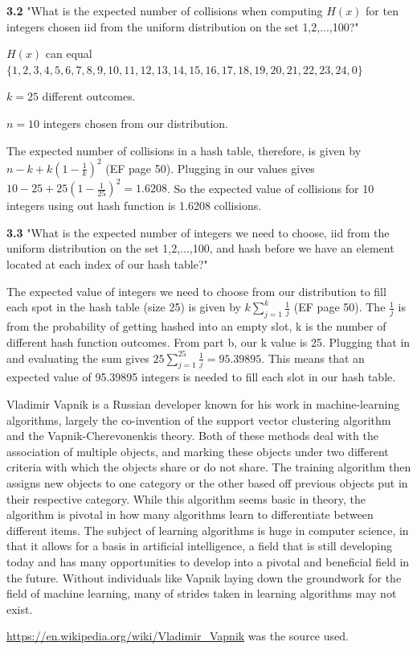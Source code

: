 \documentclass{article}
\begin{document}
\item\textbf{3.2} "What is the expected number of collisions when computing $H(x)$ for ten integers chosen iid from the uniform distribution on the set {1,2,...,100}?"

\item $H(x)$ can equal$ \{1,2,3,4,5,6,7,8,9,10,11,12,13,14,15,16,17,18,19,20,21,22,23,24,0\}$

$k = 25$ different outcomes.

$n = 10$ integers chosen from our distribution.

The expected number of collisions in a hash table, therefore, is given by $n - k + k(1-\frac{1}{k})^2$ (EF page 50). Plugging in our values gives $10 - 25 + 25(1-\frac{1}{25})^2 = 1.6208$. So the expected value of collisions for 10 integers using out hash function is 1.6208 collisions.


\item\textbf{3.3} "What is the expected number of integers we need to choose, iid from the uniform distribution on the set {1,2,...,100}, and hash before we have an element located at each index of our hash table?"
\item The expected value of integers we need to choose from our distribution to fill each spot in the hash table (size 25) is given by $k\sum_{j=1}^{k}\frac{1}{j}$ (EF page 50). The $\frac{1}{j}$ is from the probability of getting hashed into an empty slot, k is the number of different hash function outcomes. From part b, our k value is 25. Plugging that in and evaluating the sum gives $25\sum_{j=1}^{25}\frac{1}{j} = 95.39895$. This means that an expected value of 95.39895 integers is needed to fill each slot in our hash table.


\clearpage
\header
Vladimir Vapnik is a Russian developer known for his work in machine-learning algorithms, largely the co-invention of the support vector clustering algorithm and the Vapnik-Cherevonenkis theory. Both of these methods deal with the association of multiple objects, and marking these objects under two different criteria with which the objects share or do not share. The training algorithm then assigns new objects to one category or the other based off previous objects put in their respective category. While this algorithm seems basic in theory, the algorithm is pivotal in how many algorithms learn to differentiate between different items. The subject of learning algorithms is huge in computer science, in that it allows for a basis in artificial intelligence, a field that is still developing today and has many opportunities to develop into a pivotal and beneficial field in the future. Without individuals like Vapnik laying down the groundwork for the field of machine learning, many of strides taken in learning algorithms may not exist. 
\item[]\url{https://en.wikipedia.org/wiki/Vladimir_Vapnik} was the source used.
\end{document}
